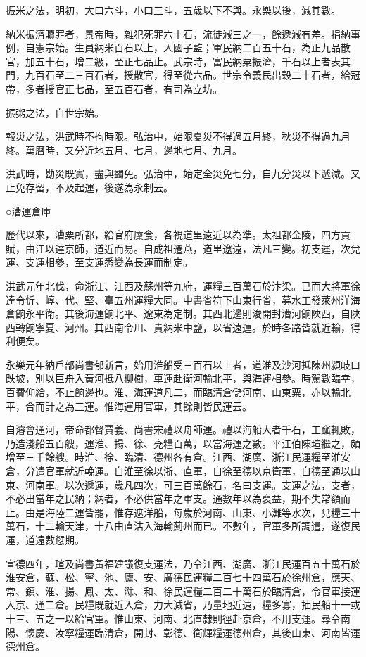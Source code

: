 振米之法，明初，大口六斗，小口三斗，五歲以下不與。永樂以後，減其數。

納米振濟贖罪者，景帝時，雜犯死罪六十石，流徒減三之一，餘遞減有差。捐納事例，自憲宗始。生員納米百石以上，人國子監；軍民納二百五十石，為正九品散官，加五十石，增二級，至正七品止。武宗時，富民納粟振濟，千石以上者表其門，九百石至二三百石者，授散官，得至從六品。世宗令義民出穀二十石者，給冠帶，多者授官正七品，至五百石者，有司為立坊。

振粥之法，自世宗始。

報災之法，洪武時不拘時限。弘治中，始限夏災不得過五月終，秋災不得過九月終。萬曆時，又分近地五月、七月，邊地七月、九月。

洪武時，勘災既實，盡與蠲免。弘治中，始定全災免七分，自九分災以下遞減。又止免存留，不及起運，後遂為永制云。

○漕運倉庫

歷代以來，漕粟所都，給官府廩食，各視道里遠近以為準。太祖都金陵，四方貢賦，由江以達京師，道近而易。自成祖遷燕，道里遼遠，法凡三變。初支運，次兌運、支運相參，至支運悉變為長運而制定。

洪武元年北伐，命浙江、江西及蘇州等九府，運糧三百萬石於汴梁。已而大將軍徐達令忻、崞、代、堅、臺五州運糧大同。中書省符下山東行省，募水工發萊州洋海倉餉永平衛。其後海運餉北平、遼東為定制。其西北邊則浚開封漕河餉陜西，自陜西轉餉寧夏、河州。其西南令川、貴納米中鹽，以省遠運。於時各路皆就近輸，得利便矣。

永樂元年納戶部尚書郁新言，始用淮船受三百石以上者，道淮及沙河抵陳州潁岐口跌坡，別以巨舟入黃河抵八柳樹，車運赴衛河輸北平，與海運相參。時駕數臨幸，百費仰給，不止餉邊也。淮、海運道凡二，而臨清倉儲河南、山東粟，亦以輸北平，合而計之為三運。惟海運用官軍，其餘則皆民運云。

自濬會通河，帝命都督賈義、尚書宋禮以舟師運。禮以海船大者千石，工窳輒敗，乃造淺船五百艘，運淮、揚、徐、兗糧百萬，以當海運之數。平江伯陳瑄繼之，頗增至三千餘艘。時淮、徐、臨清、德州各有倉。江西、湖廣、浙江民運糧至淮安倉，分遣官軍就近輓運。自淮至徐以浙、直軍，自徐至德以京衛軍，自德至通以山東、河南軍。以次遞運，歲凡四次，可三百萬餘石，名曰支運。支運之法，支者，不必出當年之民納；納者，不必供當年之軍支。通數年以為裒益，期不失常額而止。由是海陸二運皆罷，惟存遮洋船，每歲於河南、山東、小灘等水次，兌糧三十萬石，十二輸天津，十八由直沽入海輸薊州而已。不數年，官軍多所調遣，遂復民運，道遠數愆期。

宣德四年，瑄及尚書黃福建議復支運法，乃令江西、湖廣、浙江民運百五十萬石於淮安倉，蘇、松、寧、池、廬、安、廣德民運糧二百七十四萬石於徐州倉，應天、常、鎮、淮、揚、鳳、太、滁、和、徐民運糧二百二十萬石於臨清倉，令官軍接運入京、通二倉。民糧既就近入倉，力大減省，乃量地近遠，糧多寡，抽民船十一或十三、五之一以給官軍。惟山東、河南、北直隸則徑赴京倉，不用支運。尋令南陽、懷慶、汝寧糧運臨清倉，開封、彰德、衛輝糧運德州倉，其後山東、河南皆運德州倉。

